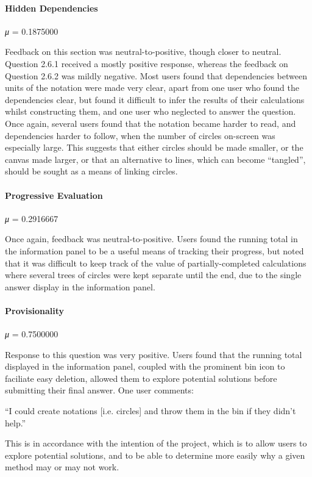\documentclass[12pt,twoside,notitlepage,xetex]{report}
\begin{document}
\paragraph{Hidden Dependencies}\hfill

\emph{μ} = 0.1875000

Feedback on this section was neutral-to-positive, though closer to neutral.  Question 2.6.1 received a mostly positive response, whereas the feedback on Question 2.6.2 was mildly negative.  Most users found that dependencies between units of the notation were made very clear, apart from one user who found the dependencies clear, but found it difficult to infer the results of their calculations whilst constructing them, and one user who neglected to answer the question.  Once again, several users found that the notation became harder to read, and dependencies harder to follow, when the number of circles on-screen was especially large.  This suggests that either circles should be made smaller, or the canvas made larger, or that an alternative to lines, which can become ``tangled'', should be sought as a means of linking circles.

\paragraph{Progressive Evaluation}\hfill

\emph{μ} = 0.2916667

Once again, feedback was neutral-to-positive.  Users found the running total in the information panel to be a useful means of tracking their progress, but noted that it was difficult to keep track of the value of partially-completed calculations where several trees of circles were kept separate until the end, due to the single answer display in the information panel.

\paragraph{Provisionality}\hfill

\emph{μ} = 0.7500000

Response to this question was very positive.  Users found that the running total displayed in the information panel, coupled with the prominent bin icon to faciliate easy deletion, allowed them to explore potential solutions before submitting their final answer.  One user comments:
\begin{center}
\parbox[c]{\textwidth-2cm}{
\small
``I could create notations [i.e. circles] and throw them in the bin if they didn't help.''
}
\end{center}
This is in accordance with the intention of the project, which is to allow users to explore potential solutions, and to be able to determine more easily why a given method may or may not work.
\end{document}
